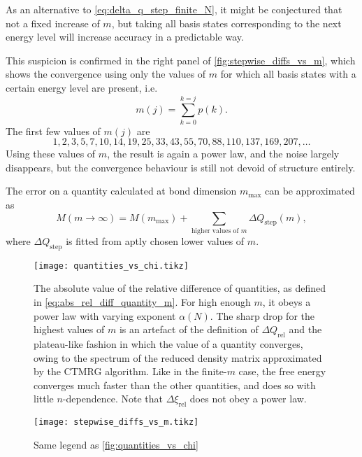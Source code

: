 As an alternative to \autoref{eq:delta_q_step_finite_N}, it might be conjectured that not a fixed increase of $m$,
but taking all basis states corresponding to the next energy level will increase accuracy in a predictable way.

This suspicion is confirmed in the right panel of \autoref{fig:stepwise_diffs_vs_m},
which shows the convergence using only the values of $m$ for which all basis states with a certain energy level are
present, i.e.
\cite{okunishi1999universal}
\begin{equation}
  m(j) = \sum_{k = 0}^{k = j} p(k).
\end{equation}
The first few values of $m(j)$ are
\begin{equation}\label{eq:m_values_all_degenerate_basis_states}
  1, 2, 3, 5, 7, 10, 14, 19, 25, 33, 43, 55, 70, 88, 110, 137, 169, 207, \dots
\end{equation}
Using these values of $m$, the result is again a power law, and the noise largely disappears, but the convergence
behaviour is still not devoid of structure entirely.

The error on a quantity calculated at bond dimension $m_{\text{max}}$ can be approximated as
\begin{equation}
  M(m \to \infty) = M(m_{\text{max}}) + \sum_{\text{higher values of $m$}} \Delta Q_{\text{step}}(m),
\end{equation}
where $\Delta Q_{\text{step}}$ is fitted from aptly chosen lower values of $m$.


\begin{figure}
  \texttt{[image: quantities\_vs\_chi.tikz]}
  \caption{The absolute value of the relative difference of quantities, as defined in \autoref{eq:abs_rel_diff_quantity_m}.
  For high enough $m$, it obeys a power law with varying exponent $\alpha(N)$.
  The sharp drop for the highest values of $m$ is an artefact of the definition of $\Delta Q_{\text{rel}}$ and the
  plateau-like fashion in which the value of a quantity converges,
  owing to the spectrum of the reduced density matrix approximated by the CTMRG algorithm.
  Like in the finite-$m$ case, the free energy converges much faster than the other quantities,
  and does so with little $n$-dependence.
  Note that $\Delta \xi_{\text{rel}}$ does not obey a power law.}\label{fig:quantities_vs_chi}
\end{figure}

\begin{figure}
  \texttt{[image: stepwise\_diffs\_vs\_m.tikz]}
  \caption{Same legend as \autoref{fig:quantities_vs_chi}}\label{fig:stepwise_diffs_vs_m}
\end{figure}


